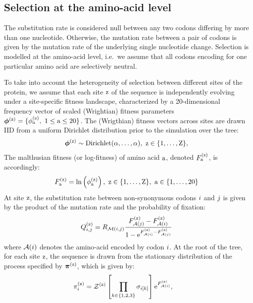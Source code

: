 \documentclass{article}
\begin{document}
\subsection{Selection at the amino-acid level}
\label{sec:mut-bias-aa-selection}

The {substitution} rate is considered null between any two codons differing by more than one nucleotide.
Otherwise, the mutation rate between a pair of codons is given by the mutation rate of the underlying single nucleotide change.
Selection is modelled at the amino-acid level, i.e.~we assume that all codons encoding for one particular amino acid are selectively {neutral}.

To take into account the heterogeneity of selection between different sites of the protein, we assume that each site $\text{z}$ of the sequence is independently evolving under a site-specific fitness landscape, characterized by a 20-dimensional frequency vector of scaled (Wrightian) fitness parameters $\bm{\phi}^{(\text{z})} = \{ \phi^{(\text{z})}_{\text{a}},\ 1 \leq \text{a} \leq 20 \}$.
The (Wrigthian) fitness vectors across sites are drawn IID from a uniform Dirichlet distribution {prior} to the simulation over the tree:
\begin{equation}
    \bm{\phi}^{(\text{z})} \sim \text{Dirichlet} (\alpha, \hdots, \alpha),\ \text{z} \in \{1, \hdots, \text{Z}\},
\end{equation}
The malthusian fitness (or log-fitness) of amino acid $\text{a}$, denoted $F^{(\text{z})}_{\text{a}}$, is accordingly:
\begin{equation}
    F^{(\text{z})}_{\text{a}} = \ln \left( \phi^{(\text{z})}_{\text{a}} \right),\ \text{z} \in \{1, \hdots, \text{Z}\}, \ \text{a} \in \{1, \hdots, 20\}
\end{equation}
At site $\text{z}$, the {substitution} rate between {non-synonymous} codons ${i}$ and ${j}$ is given by the product of the mutation rate and the probability of fixation:
\begin{equation}
    Q_{{i}, {j}}^{(\text{z})} = R_{\mathcal{M}({i}, {j})} \dfrac{F_{\mathcal{A}({j})}^{(\text{z})} - F_{\mathcal{A}({i})}^{(\text{z})}}{1 - \text{e}^{F_{\mathcal{A}({i})}^{(\text{z})} - F_{\mathcal{A}({j})}^{(\text{z})}} } \label{eq:codonsubrates}
\end{equation}
where $\mathcal{A}({i})$ denotes the amino-acid encoded by codon ${i}$.
At the root of the tree, for each site $\text{z}$, the sequence is drawn from the stationary distribution of the process specified by $\bm{\pi}^{(\text{z})}$, which is given by:
\begin{align}
    \pi_{{i}}^{(\text{z})} & = \mathcal{Z}^{(\text{z})} \left[\prod\limits_{k \in \{ 1, 2, 3 \}} \sigma_{{i}[k]}\right] \text{e}^{F_{\mathcal{A}({i})}^{(\text{z})}},
    \label{codonStationarity}
\end{align}
\end{document}
